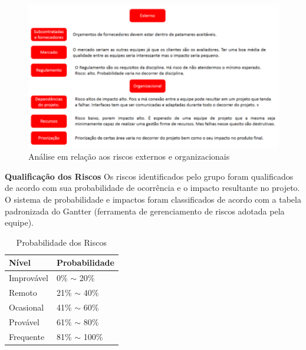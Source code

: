 		\graphicspath{{figuras/}}
		\begin{figure}[h!]
			\centering
			\includegraphics[scale=0.80]{analise_riscos_externos.png}
			\caption{Análise em relação aos riscos externos e organizacionais}
			\label{img:analise_riscos_externos}
		\end{figure}	
		
		\textbf{Qualificação dos Riscos}
		Os riscos identificados pelo grupo foram qualificados de acordo com sua probabilidade de ocorrência e o impacto resultante no projeto. O sistema de probabilidade e impactos foram classificados de acordo com a tabela padronizada do Gantter (ferramenta de gerenciamento de riscos adotada pela equipe).
		
		\begin{table}[h!]
			\centering
			\caption{Probabilidade dos Riscos}
			\label{tabela_probabilidade_riscos}
			\begin{tabular}{|ll|}
				\hline
				\multicolumn{1}{|l|}{\textbf{Nível}} & \textbf{Probabilidade} \\ \hline
				Improvável                           & 0\% $\sim$ 20\%        \\
				Remoto                               & 21\% $\sim$ 40\%       \\
				Ocasional                            & 41\% $\sim$ 60\%       \\
				Provável                             & 61\% $\sim$ 80\%       \\
				Frequente                            & 81\% $\sim$ 100\%      \\ \hline
			\end{tabular}
		\end{table}	
		
